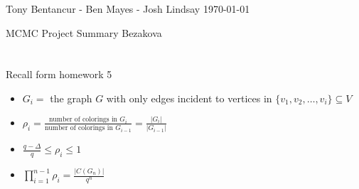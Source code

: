 \documentclass[12]{article}
\begin{document}
\large Tony Bentancur - Ben Mayes - Josh Lindsay
\nobreak
\hfill \today{}

MCMC Project Summary
\hfill Bezakova
\\\\
						\IncMargin{1em}\\	
Recall form homework 5				
\begin{itemize}
\item $\displaystyle G_i = $ the graph $G$ with only edges incident to vertices in $\{v_1, v_2, \ldots ,v_i\} \subseteq V$
\item $\displaystyle\rho_i = \frac{\mbox{number of colorings in } G_{i} }{\mbox{number of colorings in } G_{i-1} } = \frac{|G_i|}{|G_{i-1}|}$
\item $\displaystyle\frac{q-\Delta}{q} \leq \rho_i \leq 1$
\item $\displaystyle\prod_{i=1}^{n-1}{\rho_i} = \frac{|C(G_n)|}{q^n}$
\end{itemize}
						


			
					
							
							
\end{document}

